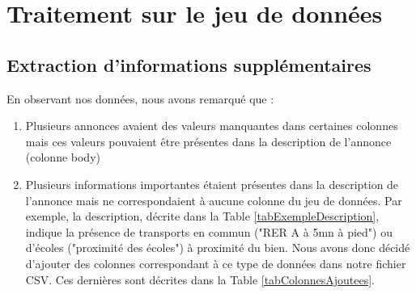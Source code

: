 \documentclass[a4paper, 12pt, twoside]{report}
\begin{document}
	\section{Traitement sur le jeu de données}

		\subsection{Extraction d’informations supplémentaires}
		\label{section:extractionLlm}

		En observant nos données, nous avons remarqué que :
		\begin{enumerate}
			\item Plusieurs annonces avaient des valeurs manquantes dans certaines colonnes mais ces valeurs pouvaient être présentes dans la description de l'annonce (colonne body) 
			\item Plusieurs informations importantes étaient présentes dans la description de l'annonce mais ne correspondaient à aucune colonne du jeu de données. Par exemple, la description, décrite dans la Table \ref{tabExempleDescription}, indique la présence de transports en commun ("RER A à 5mn à pied") ou d'écoles ("proximité des écoles") à proximité du bien. Nous avons donc décidé d'ajouter des colonnes correspondant à ce type de données dans notre fichier CSV. Ces dernières sont décrites dans la Table \ref{tabColonnesAjoutees}. \\
		\end{enumerate}
\end{document}
